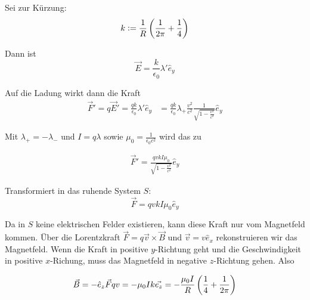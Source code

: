 \documentclass[a4paper,german,12pt,smallheadings]{scrartcl}
\begin{document}
Sei zur Kürzung:
\begin{equation}
  k := \frac{1}{R} \del{\frac{1}{2 \pi} + \frac{1}{4}}
\end{equation}

Dann ist
\begin{equation}
  \vec{E} = \frac{k}{\epsilon_0} \lambda' \hat{e}_y
\end{equation}

Auf die Ladung wirkt dann die Kraft
\begin{align*}
  \vec{F}' = q \vec{E}' = \frac{qk}{\epsilon_0} \lambda' \hat{e}_y
  &= \frac{qk}{\epsilon_0} \lambda_{+} \frac{v^2}{c^2} \frac{1}{\sqrt{1-\frac{v^2}{c^2}}} \hat{e}_y
\end{align*}

Mit $\lambda_+ = -\lambda_-$ und $I = q \lambda$ sowie $\mu_0 =
\frac{1}{\epsilon_0 c^2}$ wird das zu

\begin{align*}
  \vec{F}' = \frac{qv kI \mu_0}{\sqrt{1 - \frac{v^2}{c^2}}} \hat{e}_y
\end{align*}

Transformiert in das ruhende System $S$:
\begin{equation}
  \vec{F} = qvkI \mu_0 \hat{e}_y
\end{equation}

Da in $S$ keine elektrischen Felder existieren, kann diese Kraft nur vom
Magnetfeld kommen. Über die Lorentzkraft $\vec{F} = q\vec{v} \times \vec{B}$
und $\vec{v} = v \hat{e}_x$ rekonstruieren wir das Magnetfeld. Wenn die Kraft
in positive $y$-Richtung geht und die Geschwindigkeit in positive $x$-Richung,
muss das Magnetfeld in negative $z$-Richtung gehen. Also

\begin{equation}
  \vec{B} = -\hat{e}_z \vec{F}{qv} = - \mu_0 I k \vec{e_z} = - \frac{\mu_0 I}{R} \del{\frac{1}{4} + \frac{1}{2\pi}}
\end{equation}
\end{document}
